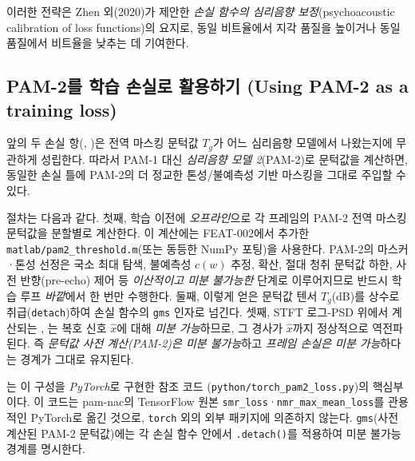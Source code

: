 \documentclass[11pt,a4paper]{article}
\begin{document}
이러한 전략은 Zhen 외(2020)\cite{zhen2020}가 제안한 \emph{손실 함수의 심리음향
보정}(psychoacoustic calibration of loss functions)의 요지로, 동일 비트율에서
지각 품질을 높이거나 동일 품질에서 비트율을 낮추는 데 기여한다.

\subsection{PAM-2를 학습 손실로 활용하기 (Using PAM-2 as a training loss)}
\label{sec:pam2loss}
앞의 두 손실 항(, )은 전역 마스킹 문턱값
$T_g$가 어느 심리음향 모델에서 나왔는지에 무관하게 성립한다. 따라서 PAM-1 대신
\emph{심리음향 모델 2}(PAM-2)로 문턱값을 계산하면, 동일한 손실 틀에 PAM-2의
더 정교한 톤성/불예측성 기반 마스킹을 그대로 주입할 수 있다.

절차는 다음과 같다. 첫째, 학습 이전에 \emph{오프라인}으로 각 프레임의 PAM-2
전역 마스킹 문턱값을 분할별로 계산한다. 이 계산에는 FEAT-002에서 추가한
\texttt{matlab/pam2\_threshold.m}(또는 동등한 NumPy 포팅)을 사용한다. PAM-2의
마스커·톤성 선정은 국소 최대 탐색, 불예측성 $c(w)$ 추정, 확산, 절대 청취 문턱값
하한, 사전 반향(pre-echo) 제어 등 \emph{이산적이고 미분 불가능한} 단계로 이루어지므로
반드시 학습 루프 \emph{바깥}에서 한 번만 수행한다. 둘째, 이렇게 얻은 문턱값
텐서 $T_g$(dB)를 상수로 취급(\texttt{detach})하여 손실 함수의 \texttt{gms}
인자로 넘긴다. 셋째, STFT 로그-PSD 위에서 계산되는 ,
는 복호 신호 $\hat{x}$에 대해 \emph{미분 가능}하므로, 그 경사가
$\hat{x}$까지 정상적으로 역전파된다. 즉 \emph{문턱값 사전 계산(PAM-2)은 미분
불가능}하고 \emph{프레임 손실은 미분 가능}하다는 경계가 그대로 유지된다.

는 이 구성을 \emph{PyTorch}로 구현한 참조 코드
(\texttt{python/torch\_pam2\_loss.py})의 핵심부이다. 이 코드는 pam-nac의
TensorFlow 원본 \texttt{smr\_loss}·\texttt{nmr\_max\_mean\_loss}를 관용적인
PyTorch로 옮긴 것으로, \texttt{torch} 외의 외부 패키지에 의존하지 않는다.
\texttt{gms}(사전 계산된 PAM-2 문턱값)에는 각 손실 함수 안에서 \texttt{.detach()}를
적용하여 미분 불가능 경계를 명시한다.
\end{document}
